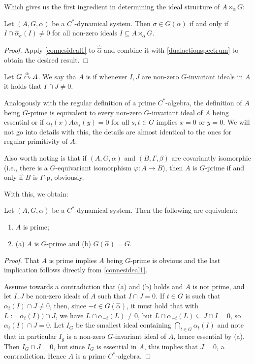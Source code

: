 Which gives us the first ingredient in determining the ideal structure of $A \rtimes_\alpha G$:
\begin{corollary}
	Let $(A,G,\alpha)$ be a $C^*$-dynamical system. Then $\sigma \in \hat G ( \alpha)$ if and only if $I \cap \hat \alpha_\sigma (I) \neq 0$ for all non-zero ideals $I \subseteq A \rtimes_\alpha G$.
	\label{olpe1.5.4}
\end{corollary}
\begin{proof}
	Apply \cref{connesideal1} to $\hat{ \hat{ \alpha}}$ and combine it with \cref{dualactionspectrum} to obtain the desired result.
\end{proof}
\begin{definition}
	 Let $G \stackrel{\alpha}{\curvearrowright} A$. We say tha $A$ is  if whenever $I,J$ are non-zero $G$-invariant ideals in $A$ it holds that $I \cap J \neq 0$.
\end{definition}
\begin{remark}
	Analogously with the regular definition of a prime $C^*$-algebra, the definition of $A$ being $G$-prime is equivalent to every non-zero $G$-invariant ideal of $A$ being essential or if $\alpha_t(x) A \alpha_s(y)=0$ for all $s,t \in G$ implies $x = 0$ or $y = 0$. We will not go into details with this, the details are almost identical to the ones for regular primitivity of $A$.

	Also worth noting is that if $(A,G,\alpha)$ and $(B, \Gamma, \beta)$ are covariantly isomorphic (i.e., there is a $G$-equivariant isomorphism $\varphi \colon A \to B$), then $A$ is $G$-prime if and only if $B$ is $\Gamma$-p, obviously.
\end{remark}
With this, we obtain:
\begin{lemma}
	Let $(A,G,\alpha)$ be a $C^*$-dynamical system. Then the following are equivalent:
	\begin{enumerate}
		\item $A$ is prime;
		\item (a) $A$ is $G$-prime and (b) $G(\hat \alpha ) =G$.
	\end{enumerate}
	\label{olpe1.3.4}
\end{lemma}
\begin{proof}
	That $A$ is prime implies $A$ being $G$-prime is obvious and the last implication follows directly from \cref{connesideal1}.

	Assume towards a contradiction that (a) and (b) holds and $A$ is not prime, and let $I, J$ be non-zero ideals of $A$ such that $I \cap J = 0$. If $t \in G$ is such that $\alpha_t(I) \cap J \neq 0$, then, since $-t \in G(\hat \alpha)$, it must hold that with $L := \alpha_t(I)) \cap J$, we have $L \cap \alpha_{-t}(L) \neq 0$, but $L \cap \alpha_{-t}(L) \subseteq  J \cap I = 0$, so $\alpha_t(I) \cap J = 0$. Let $I_G$ be the smallest ideal containing $\bigcap_{t \in G} \alpha_t(I)$ and note that in particular $I_g$ is a non-zero $G$-invariant ideal of $A$, hence essential by (a). Then $I_G \cap J = 0$, but since $I_G$ is essential in $A$, this implies that $J = 0$, a contradiction. Hence $A$ is a prime $C^*$-algebra.
\end{proof}
